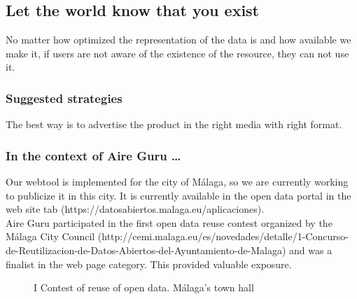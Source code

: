 \subsection{Let the world know that you exist}

No matter how optimized the representation of the data is and how available we make it, if users are not aware
of the existence of the resource, they can not use it.

\subsubsection*{Suggested strategies} 

The best way is to advertise the product in the right media with right format.

\subsubsection*{In the context of Aire Guru \ldots}

Our webtool is implemented for the city of Málaga, so we are currently working to publicize it in this city.
It is currently available in the open data portal in the web site tab (https://datosabiertos.malaga.eu/aplicaciones). \\

Aire Guru participated in the first open data reuse contest organized by the Málaga City Council (http://cemi.malaga.eu/es/novedades/detalle/1-Concurso-de-Reutilizacion-de-Datos-Abiertos-del-Ayuntamiento-de-Malaga)
and was a finalist in the web page category. This provided valuable exposure.

\begin{figure}[ht]
    \centering
    \hfill
    \caption{I Contest of reuse of open data. Málaga's town hall}
\end{figure}